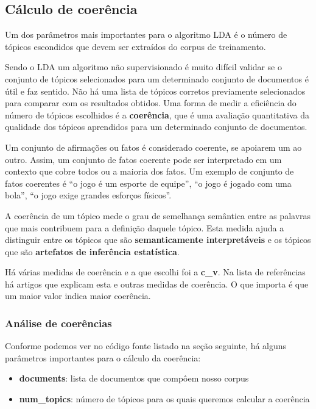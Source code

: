 \subsection{Cálculo de coerência}

Um dos parâmetros mais importantes para o algoritmo LDA é o número de tópicos escondidos que devem ser extraídos do corpus de treinamento.

Sendo o LDA um algoritmo não supervisionado é muito difícil validar se o conjunto de tópicos selecionados para um determinado conjunto de documentos
é útil e faz sentido. Não há uma lista de tópicos corretos previamente selecionados para comparar com os resultados obtidos. Uma forma de medir a 
eficiência do número de tópicos escolhidos é a \textbf{coerência}, que é uma avaliação quantitativa da qualidade dos tópicos aprendidos para um determinado 
conjunto de documentos.

Um conjunto de afirmações ou fatos é considerado coerente, se apoiarem um ao outro. Assim, um conjunto de fatos coerente pode ser interpretado 
em um contexto que cobre todos ou a maioria dos fatos. Um exemplo de conjunto de fatos coerentes é “o jogo é um esporte de equipe”, 
“o jogo é jogado com uma bola”, “o jogo exige grandes esforços físicos”.

A coerência de um tópico mede o grau de semelhança semântica entre as palavras que mais contribuem para a definição daquele tópico.
Esta medida ajuda a distinguir entre os tópicos que são \textbf{semanticamente interpretáveis} e os tópicos que são 
\textbf{artefatos de inferência estatística}.

Há várias medidas de coerência e a que escolhi foi a \textbf{c\_v}. Na lista de referências há artigos que explicam esta e outras 
medidas de coerência. O que importa é que um maior valor indica maior coerência.

\subsubsection{Análise de coerências}

Conforme podemos ver no código fonte listado na seção seguinte, há alguns parâmetros importantes para o cálculo da coerência:

\begin{itemize}
    \item \textbf{documents}: lista de documentos que compôem nosso corpus
    \item \textbf{num\_topics}: número de tópicos para os quais queremos calcular a coerência
\end{itemize}

